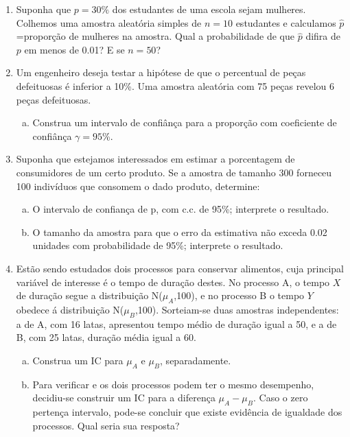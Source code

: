 \documentclass[10pt,brazil,addpoints]{exam}
\begin{document}
\begin{enumerate}[1.]

\item Suponha que $p=30\%$ dos estudantes de uma escola sejam
mulheres. Colhemos uma amostra aleatória simples de $n=10$
estudantes e calculamos  $\hat{p}$=proporção de mulheres na amostra.
Qual a probabilidade de que $\hat{p}$ difira de $p$
em menos de 0.01?  E se $n=50$?

\medskip
\item Um engenheiro deseja testar a hipótese de que o percentual de peças defeituosas é inferior a 10\%. Uma amostra aleatória com 75 peças revelou 6 peças defeituosas.

\begin{enumerate}[a)]
\item Construa um intervalo de confiânça para a proporção com coeficiente de confiânça $\gamma=95$\%.
\end{enumerate}



\medskip
\item Suponha que estejamos interessados em estimar a porcentagem de
consumidores de um certo produto. Se a amostra de tamanho 300
forneceu 100 indivíduos que consomem o dado produto, determine:
\begin{enumerate}[a)]
\item O intervalo de confiança de p, com c.c.  de 95\%; interprete o
resultado.
\item O tamanho da amostra para que o erro da estimativa não
exceda 0.02 unidades com probabilidade de 95\%; interprete o
resultado.
\end{enumerate}




\medskip
\item Estão sendo estudados dois processos para conservar alimentos,
cuja principal variável de interesse  é o tempo de duração destes.
No processo A, o tempo $X$ de duração segue a distribuição
N($\mu_A$,100), e no processo B o tempo $Y$
obedece á distribuição N($\mu_B$,100).  Sorteiam-se duas amostras independentes:  a de A, com 16 latas, apresentou tempo médio de duração igual a 50, e a
de B, com 25 latas, duração média igual a 60.

\begin{enumerate}[a)]
\item Construa um IC para $\mu_A$ e $\mu_B$, separadamente.
\item Para verificar e os dois processos podem ter o mesmo desempenho, decidiu-se construir um IC para a diferença $\mu_A-\mu_B$.  Caso o zero pertença intervalo, pode-se concluir que existe evidência de igualdade dos processos.  Qual seria sua resposta?
\end{enumerate}





\end{enumerate}
\end{document}
